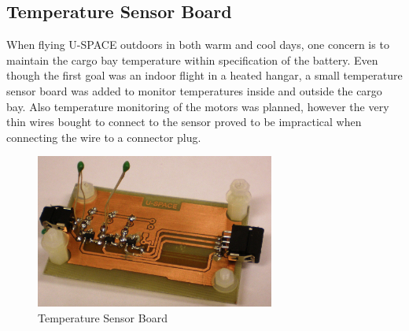 \subsection{Temperature Sensor Board}
%
When flying U-SPACE outdoors in both warm and cool days, one concern is to maintain the cargo bay temperature within specification of the battery. Even though the first goal was an indoor flight in a heated hangar, a small temperature sensor board was added to monitor temperatures inside and outside the cargo bay. Also temperature monitoring of the motors was planned, however the very thin wires bought to connect to the sensor proved to be impractical when connecting the wire to a connector plug.
%
\begin{figure}[H]
\centering
\includegraphics[width=0.7\textwidth]{figures/fig_Temp_top}
\caption{Temperature Sensor Board}
\label{fig:TS_top}
\end{figure}
%
